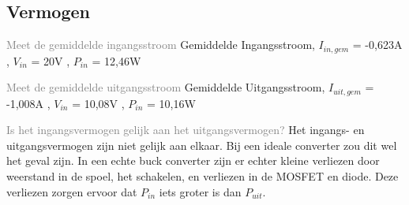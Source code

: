 \subsection{Vermogen}
\textcolor{gray}{Meet de gemiddelde ingangsstroom}\newline
Gemiddelde Ingangsstroom, \(I_{in, gem}\) = -0,623A , \(V_{in}\) = 20V , \(P_{in}\) = 12,46W \newline

\textcolor{gray}{Meet de gemiddelde uitgangsstroom}\newline
Gemiddelde Uitgangsstroom, \(I_{uit, gem}\) = -1,008A , \(V_{in}\) =  10,08V , \(P_{in}\) = 10,16W

\textcolor{gray}{Is het ingangsvermogen gelijk aan het uitgangsvermogen?}\newline
Het ingangs- en uitgangsvermogen zijn niet gelijk aan elkaar. Bij een ideale converter zou dit wel het geval zijn. In een echte buck converter zijn er echter kleine verliezen door weerstand in de spoel, het schakelen, en verliezen in de MOSFET en diode. Deze verliezen zorgen ervoor dat \(P_{in}\) iets groter is dan \(P_{uit}\).  